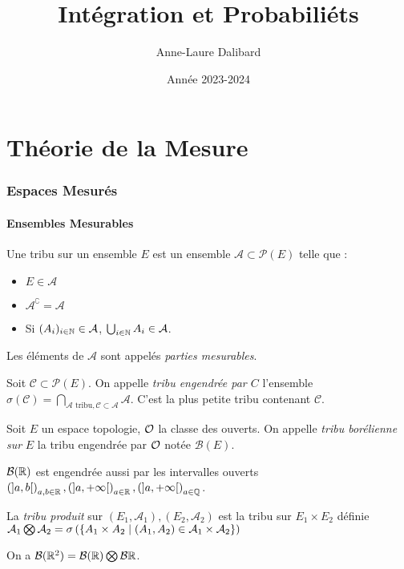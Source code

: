 \documentclass{cours}
\title{Intégration et Probabiliéts}
\author{Anne-Laure Dalibard}
\date{Année 2023-2024}
\begin{document}
\part{Théorie de la Mesure}
\section{Espaces Mesurés}
\subsection{Ensembles Mesurables}
\begin{definition}
    Une tribu sur un ensemble $E$ est un ensemble $\mathcal{A} \subset \mathcal{P}(E)$ telle que :
    \begin{itemize}
        \item $E \in \mathcal{A}$
        \item $\mathcal{A}^{\complement} = \mathcal{A}$
        \item Si $(A_{i})_{i \in \mathbb{N}} \in \mathcal{A}$, $\bigcup_{i \in \mathbb{N}} A_{i} \in \mathcal{A}$.
    \end{itemize}
    Les éléments de $\mathcal{A}$ sont appelés \emph{parties mesurables}.
\end{definition}

\begin{definition}
    Soit $\mathcal{C} \subset \mathcal{P}(E)$. On appelle \emph{tribu engendrée par $C$} l'ensemble $\sigma(\mathcal{C}) = \bigcap_{\mathcal{A} \text{ tribu}, \mathcal{C} \subset \mathcal{A} } \mathcal{A}$. C'est la plus petite tribu contenant $\mathcal{C}$.
\end{definition}

\begin{definition}
    Soit $E$ un espace topologie, $\mathcal{O}$ la classe des ouverts. On appelle \emph{tribu borélienne sur} $E$ la tribu engendrée par $\mathcal{O}$ notée $\mathcal{B}(E)$.
\end{definition}

\begin{proposition}
    $\mathcal{B}(\mathbb{R})$ est engendrée aussi par les intervalles ouverts $\left(\left]a, b\right[\right)_{a, b \in \mathbb{R}}, \left(\left]a, +\infty\right[\right)_{a \in \mathbb{R}}, \left(\left]a, +\infty\right[\right)_{a \in \mathbb{Q}}$.
\end{proposition}

\begin{definition}
    La \emph{tribu produit} sur $(E_{1}, \mathcal{A}_{1}), (E_{2}, \mathcal{A}_{2})$ est la tribu sur $E_{1} \times E_{2}$ définie $\mathcal{A}_{1} \bigotimes \mathcal{A}_{2} = \sigma\left(\left\{A_{1}\times A_{2} \mid \left(A_{1}, A_{2}\right) \in \mathcal{A}_{1}\times \mathcal{A}_{2}\right\}\right)$
\end{definition}
\begin{proposition}
    On a $\mathcal{B}(\mathbb{R}^{2}) = \mathcal{B}(\mathbb{R}) \bigotimes \mathcal{B}{\mathbb{R}}$.
\end{proposition}
\end{document}
